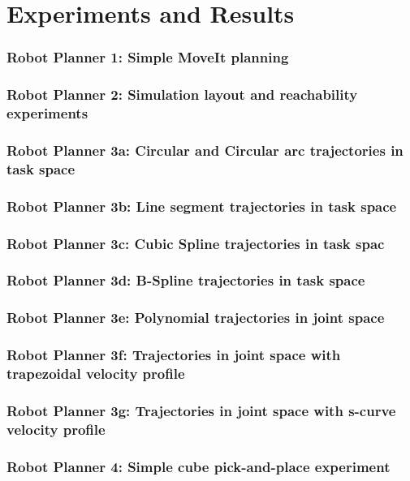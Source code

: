 \section{Experiments and Results}

\begin{frame}
\frametitle{Robot Planner 1: Simple MoveIt planning}
\end{frame}

\begin{frame}
\frametitle{Robot Planner 2: Simulation layout and reachability experiments}
\end{frame}

\begin{frame}
\frametitle{Robot Planner 3a: Circular and Circular arc trajectories in task space}
\end{frame}

\begin{frame}
\frametitle{Robot Planner 3b: Line segment trajectories in task space}
\end{frame}

\begin{frame}
\frametitle{Robot Planner 3c: Cubic Spline trajectories in task spac}
\end{frame}

\begin{frame}
\frametitle{Robot Planner 3d: B-Spline trajectories in task space}
\end{frame}

\begin{frame}
\frametitle{Robot Planner 3e: Polynomial trajectories in joint space}
\end{frame}

\begin{frame}
\frametitle{Robot Planner 3f: Trajectories in joint space with trapezoidal velocity profile}
\end{frame}

\begin{frame}
\frametitle{Robot Planner 3g: Trajectories in joint space with s-curve velocity profile}
\end{frame}

\begin{frame}
\frametitle{Robot Planner 4: Simple cube pick-and-place experiment}
\end{frame}

